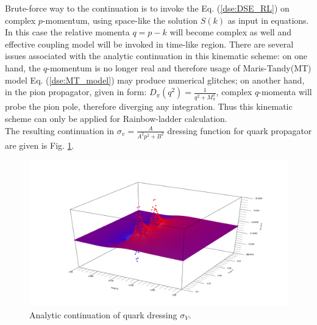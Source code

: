 Brute-force way to the continuation is to invoke the Eq. (\ref{dse:DSE_RL}) on complex $p$-momentum, using space-like the solution $S(k)$ as input in equations. In this case the relative momenta $q=p-k$ will become complex as well and effective coupling model will be invoked in time-like region. There are several issues associated with the analytic continuation in this kinematic scheme: on one hand, the $q$-momentum is no longer real and therefore usage of Maris-Tandy(MT) model Eq. (\ref{dse:MT_model}) may produce numerical glitches; on another hand, in the pion propagator, given in form: $D_\pi(q^2)=\frac{1}{q^2+M^2_\pi}$, complex $q$-momenta will probe the pion pole, therefore diverging any integration. Thus this kinematic scheme can only be applied for Rainbow-ladder calculation. \\
	The resulting continuation in $\sigma_v = \frac{A}{A^2 p^2 + B^2}$ dressing function for quark propagator are given is Fig. \ref{fig:sigma_poles}. 
\begin{figure}
\tiny
 \begin{center}
  \includegraphics[width=1.1\textwidth]{figures/sigma_poles}
 \end{center}
 \caption{\footnotesize Analytic continuation of quark dressing $\sigma_V$. }\label{fig:sigma_poles} 
\end{figure}

